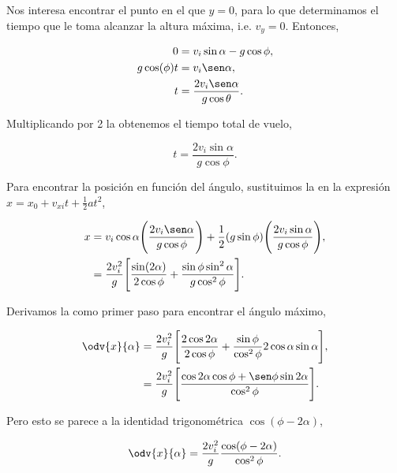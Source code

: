 \documentclass[../main.tex]{subfiles}
\begin{document}
\begin{problema}
	Nos interesa encontrar el punto en el que \(y = 0\), para lo que
	determinamos el tiempo que le toma alcanzar la altura máxima, i.e.
	\(v_{y} = 0\). Entonces,

	\begin{align}
		0             & = v_{i}\sin\alpha - g\cos\phi,\nonumber                 \\
		g\cos(\phi) t & = v_{i}\sen\alpha,\nonumber                             \\
		t             & = \dfrac{2v_{i}\sen\alpha}{g\cos\theta}.\label{eq:time}
	\end{align}

	Multiplicando por 2 la  obtenemos el
	tiempo total de vuelo,

	\begin{equation}
		t = \dfrac{2v_{i}\sin\alpha}{g\cos\phi}.
		\label{eq:tTotal}
	\end{equation}

	Para encontrar la posición en función del ángulo, sustituimos la
	 en la expresión \(x = x_{0} + v_{xi}t + \tfrac{1}{2}a t^{2}\),

	\begin{align}
		x & = v_{i}\cos\alpha \Biggl(\dfrac{2v_{i}\sen\alpha}{g\cos\phi}\Biggr) +
		\dfrac{1}{2}(g\sin\phi)\Biggl(\dfrac{2v_{i}\sin\alpha}{g\cos\phi}\Biggr),\nonumber \\
		  & = \dfrac{2v_{i}^{2}}{g}\Biggl[\dfrac{\sin(2\alpha)}{2\cos\phi} +
			\dfrac{\sin\phi\sin^{2}\alpha}{g\cos^{2}\phi}\Biggr].
		\label{eq:xAlpha}
	\end{align}

	Derivamos la  como primer paso para
	encontrar el ángulo máximo,

	\begin{align*}
		\odv{x}{\alpha} & = \dfrac{2v_{i}^{2}}{g}\Biggl[\dfrac{2\cos 2\alpha}{2\cos\phi} + \dfrac{\sin\phi}{\cos^{2}\phi}2\cos\alpha\sin\alpha\Biggr], \\
		                & = \dfrac{2v_{i}^{2}}{g}\Biggl[\dfrac{\cos 2\alpha\cos\phi + \sen\phi\sin 2\alpha}{\cos^{2}\phi}\Biggr].
	\end{align*}

	Pero esto se parece a la identidad trigonométrica \(\cos(\phi - 2\alpha)\),

	\begin{equation}
		\odv{x}{\alpha} = \dfrac{2v_{i}^{2}}{g}\dfrac{\cos(\phi - 2\alpha)}{\cos^{2}\phi}.
		\label{eq:dvX}
	\end{equation}


\end{problema}
\end{document}
